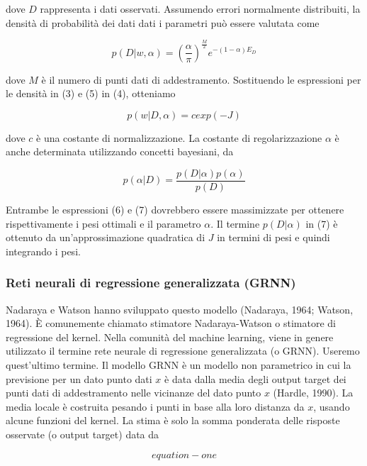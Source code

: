 \documentclass[12pt,a4paper]{report}
\begin{document}
dove $D$ rappresenta i dati osservati. Assumendo errori normalmente distribuiti, la densità di probabilità dei dati dati i parametri può essere valutata come

\begin{equation}
{ \displaystyle p(D \vert w, \alpha) = \left( \frac{\alpha}{\pi} \right)^{\frac{M}{2}}  e^{-(1 - \alpha)E_D} }
\end{equation}

dove $M$ è il numero di punti dati di addestramento. Sostituendo le espressioni per le densità in (3) e (5) in (4), otteniamo

\begin{equation}
{ \displaystyle p(w \vert D, \alpha) = c exp(-J) }
\end{equation}

dove $c$ è una costante di normalizzazione. La costante di regolarizzazione $\alpha$ è anche determinata utilizzando concetti bayesiani, da

\begin{equation}
{ \displaystyle p(\alpha \vert D) = \frac{p(D \vert \alpha)p(\alpha)}{p(D)} }
\end{equation}

Entrambe le espressioni (6) e (7) dovrebbero essere massimizzate per ottenere rispettivamente i pesi ottimali e il parametro $\alpha$. Il termine $p(D \vert \alpha)$ in (7) è ottenuto da un'approssimazione quadratica di $J$ in termini di pesi e quindi integrando i pesi. 

\subsubsection{Reti neurali di regressione generalizzata (GRNN)}
Nadaraya e Watson hanno sviluppato questo modello (Nadaraya, 1964; Watson, 1964).
È comunemente chiamato stimatore Nadaraya-Watson o stimatore di regressione del kernel. Nella comunità del machine learning, viene in genere utilizzato il termine rete neurale di regressione generalizzata (o GRNN). Useremo quest'ultimo termine. Il modello GRNN è un modello non parametrico in cui la previsione per un dato punto dati $x$ è data dalla media degli output target dei punti dati di addestramento nelle vicinanze del dato punto $x$ (Hardle, 1990). La media locale è costruita pesando i punti in base alla loro distanza da $x$, usando alcune funzioni del kernel. La stima è solo la somma ponderata delle risposte osservate (o output target) data da

\begin{equation}
equation-one
\end{equation}
\end{document}
